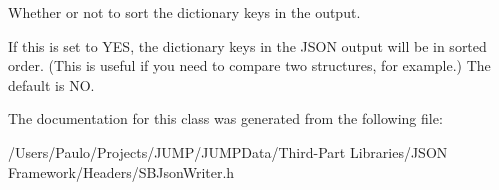 Whether or not to sort the dictionary keys in the output. 

If this is set to YES, the dictionary keys in the JSON output will be in sorted order. (This is useful if you need to compare two structures, for example.) The default is NO. 

The documentation for this class was generated from the following file:\begin{DoxyCompactItemize}
\item 
/Users/Paulo/Projects/JUMP/JUMPData/Third-\/Part Libraries/JSON Framework/Headers/SBJsonWriter.h\end{DoxyCompactItemize}
